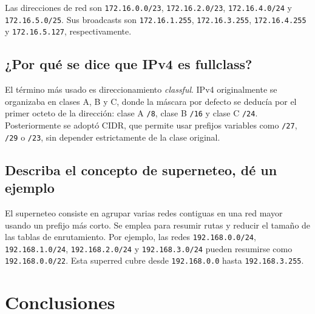 \documentclass[a4paper,12pt]{article}
\newcommand{\ip}[1]{\mbox{\texttt{#1}}}
\begin{document}
Las direcciones de red son \ip{172.16.0.0/23}, \ip{172.16.2.0/23}, \ip{172.16.4.0/24} y \ip{172.16.5.0/25}. Sus broadcasts son \ip{172.16.1.255}, \ip{172.16.3.255}, \ip{172.16.4.255} y \ip{172.16.5.127}, respectivamente.

\subsection{¿Por qué se dice que IPv4 es fullclass?}

El término más usado es direccionamiento \textit{classful}. IPv4 originalmente se organizaba en clases A, B y C, donde la máscara por defecto se deducía por el primer octeto de la dirección: clase A \ip{/8}, clase B \ip{/16} y clase C \ip{/24}. Posteriormente se adoptó CIDR, que permite usar prefijos variables como \ip{/27}, \ip{/29} o \ip{/23}, sin depender estrictamente de la clase original.

\subsection{Describa el concepto de superneteo, dé un ejemplo}

El superneteo consiste en agrupar varias redes contiguas en una red mayor usando un prefijo más corto. Se emplea para resumir rutas y reducir el tamaño de las tablas de enrutamiento. Por ejemplo, las redes \ip{192.168.0.0/24}, \ip{192.168.1.0/24}, \ip{192.168.2.0/24} y \ip{192.168.3.0/24} pueden resumirse como \ip{192.168.0.0/22}. Esta superred cubre desde \ip{192.168.0.0} hasta \ip{192.168.3.255}.

\section{Conclusiones}
\end{document}
